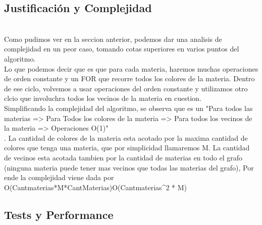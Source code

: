 \subsection{Justificaci\'on y Complejidad}
\\
Como pudimos ver en la seccion anterior, podemos dar una analisis de complejidad en un peor caso, tomando cotas superiores en varios puntos del algoritmo.\\
Lo que podemos decir que es que para cada materia, haremos muchas operaciones de orden constante y un FOR que recorre todos los colores de la materia. Dentro de ese ciclo, volvemos a usar operaciones del orden constante y utilizamos otro clcio que involuchra todos los vecinos de la materia en cuestion.\\

Simplificando la complejidad del algoritmo, se observa que es un "Para todos las materias => Para Todos los colores de la materia => Para todos los vecinos de la materia => Operaciones O(1)" \\. La cantidad de colores de la materia esta acotado por la maxima cantidad de colores que tenga una materia, que por simplicidad llamaremos M. La cantidad de vecinos esta acotada tambien por la cantidad de materias en todo el grafo (ninguna materia puede tener mas vecinos que todas las materias del grafo), Por ende la complejidad viene dada por O(Cantmaterias*M*CantMaterias)\subset O(Cantmaterias^2 * M)


\subsection{Tests y Performance}

